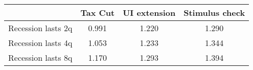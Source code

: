 \begin{tabular}{@{}lccc@{}} 
\toprule 
& Tax Cut    & UI extension    & Stimulus check    \\  \midrule 
Recession lasts 2q &0.991  & 1.220  & 1.290     \\ 
Recession lasts 4q &1.053  & 1.233  & 1.344     \\ 
Recession lasts 8q &1.170  & 1.293  & 1.394     \\ 
\end{tabular}  
